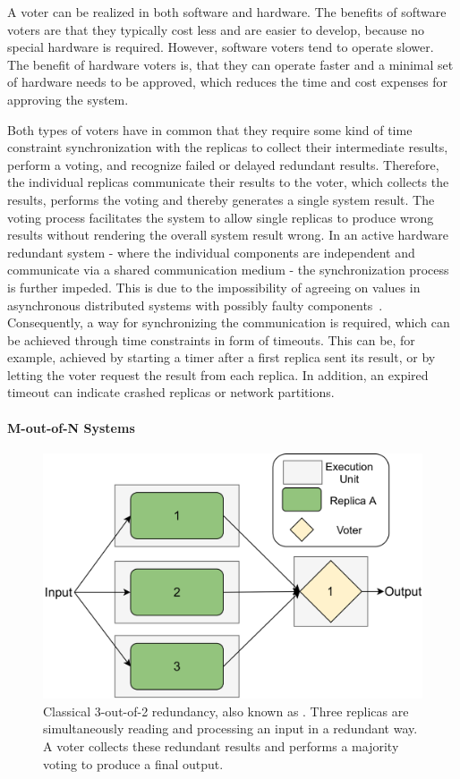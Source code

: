 A voter can be realized in both software and hardware.
The benefits of software voters are that they typically cost less and are easier to develop, because no special hardware is required.
However, software voters tend to operate slower.
The benefit of hardware voters is, that they can operate faster and a minimal set of hardware needs to be approved, which reduces the time and cost expenses for approving the system.

Both types of voters have in common that they require some kind of time constraint synchronization with the replicas to collect their intermediate results, perform a voting, and recognize failed or delayed redundant results.
Therefore, the individual replicas communicate their results to the voter, which collects the results, performs the voting and thereby generates a single system result.
The voting process facilitates the system to allow single replicas to produce wrong results without rendering the overall system result wrong.
In an active hardware redundant system - where the individual components are independent and communicate via a shared communication medium - the synchronization process is further impeded.
This is due to the impossibility of agreeing on values in asynchronous distributed systems with possibly faulty components~\cite{FLPProblemConsensus}.
Consequently, a way for synchronizing the communication is required, which can be achieved through time constraints in form of timeouts.
This can be, for example, achieved by starting a timer after a first replica sent its result, or by letting the voter request the result from each replica.
In addition, an expired timeout can indicate crashed replicas or network partitions.

\paragraph{M-out-of-N Systems}
\begin{figure}[!hb]
	\centering
	\includegraphics[width=0.8\linewidth]{images/Classical2OO3}
	\caption{Classical 3-out-of-2 redundancy, also known as . Three replicas are simultaneously reading and processing an input in a redundant way. A voter collects these redundant results and performs a majority voting to produce a final output.}
	\label{fig:Classical2OO3}
\end{figure}

